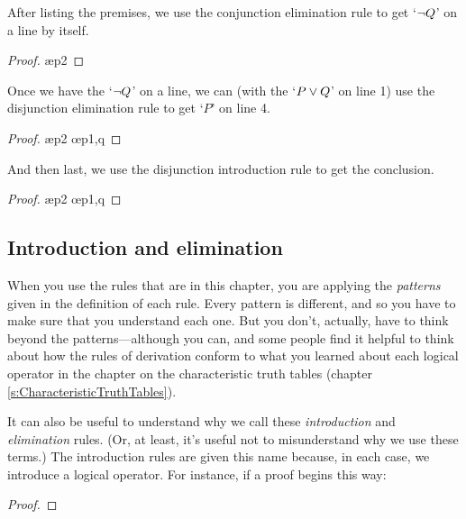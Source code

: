 After listing the premises, we use the conjunction elimination rule to get `${\neg} Q$' on a line by itself. 
\begin{proof}
	 \pr{}
	 \pr{}
	 \ae{p2}
\end{proof}
Once we have the `${\neg} Q$' on a line, we can (with the `$P \vee Q$' on line 1) use the disjunction elimination rule to get `$P$' on line 4.
\begin{proof}
	 \pr{}
	 \pr{}
	 \ae{p2}
	 \oe{p1,q}
\end{proof}
And then last, we use the disjunction introduction rule to get the conclusion.
\begin{proof}
	 \pr{}
	 \pr{}
	 \ae{p2}
	 \oe{p1,q}
	 
\end{proof}



\subsection{Introduction and elimination}
When you use the rules that are in this chapter, you are applying the \textit{patterns} given in the definition of each rule. Every pattern is different, and so you have to make sure that you understand each one. But you don't, actually, have to think beyond the patterns---although you can, and some people find it helpful to think about how the rules of derivation conform to what you learned about each logical operator in the chapter on the characteristic truth tables (chapter \ref{s:CharacteristicTruthTables}).

It can also be useful to understand why we call these \textit{introduction} and \textit{elimination} rules. (Or, at least, it's useful not to misunderstand why we use these terms.) The introduction rules are given this name because, in each case, we introduce a logical operator. For instance, if a proof begins this way: 

\begin{proof}
	 \pr{}
	 \pr{}
\end{proof}

